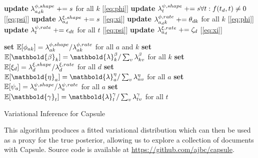 \begin{algorithm}[p]
{{		\textbf{update} $\lambda^{\phi,shape}_{a_d k} \mathrel{+}= s$ for all $k$ [\cref{eq:phi}] \;
		\textbf{update} $\lambda^{\psi,shape}_{t} \mathrel{+}= s \forall t : f(t_d, t) \neq 0$ [\cref{eq:psi}] \;
		\textbf{update} $\lambda^{\xi,shape}_{a_d} \mathrel{+}= s$ [\cref{eq:xi}] \;
		\textbf{update} $\lambda^{\phi,rate}_{a_d k} \mathrel{+}= \theta_{dk}$ for all $k$ [\cref{eq:phi}] \;
		\textbf{update} $\lambda^{\psi,rate}_t \mathrel{+}= \epsilon_{dt}$ for all $t$ [\cref{eq:psi}] \;
		\textbf{update} $\lambda^{\xi,rate}_{a_d} \mathrel{+}= \zeta_d$ [\cref{eq:xi}] \;

	}

	\textbf{set} $\mathbb{E}[\phi_{ak}] = \lambda^{\phi,shape}_{ak} / \lambda^{\phi,rate}_{ak}$ for all $a$ and $k$ \;
	\textbf{set} $\E[\mathbold{\beta}_{k}] = \mathbold{\lambda}^{\beta}_{k} / \sum_v \lambda^{\beta}_{kv}$ for all $k$ \;
	\textbf{set} $\mathbb{E}[\xi_{d}] = \lambda^{\xi,shape}_d / \lambda^{\xi,rate}_d$ for all $d$ \;
	\textbf{set} $\E[\mathbold{\eta}_{a}] = \mathbold{\lambda}^{\eta}_{a} / \sum_v \lambda^{\eta}_{nv}$ for all $a$ \;
	\textbf{set} $\mathbb{E}[\psi_a] = \lambda^{\psi,shape}_a / \lambda^{\psi,rate}_a$ for all $a$\;
	\textbf{set} $\E[\mathbold{\gamma}_t] = \mathbold{\lambda}^{\gamma}_t / \sum_v \lambda^{\gamma}_{tv}$ for all $t$ \;
}
\Return{$\mathbold{\lambda}$} \;
\caption{Variational Inference for Capsule}
\label{alg:capsule}
\end{algorithm}

This algorithm produces a fitted variational distribution which can then be used as a proxy for the true posterior, allowing us to explore a collection of documents with Capsule.  Source code is available at \url{https://github.com/ajbc/capsule}.
